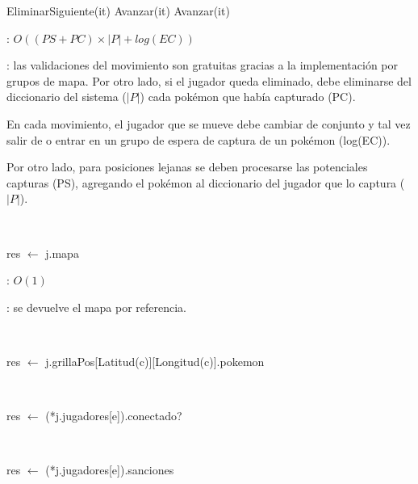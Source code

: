 \begin{Algoritmos}
\begin{algorithm}[H]
{{{					
					EliminarSiguiente(it)
				}{
					Avanzar(it)
				}
			}{
				Avanzar(it)
			}
		}
	\end{algorithm}

	\complejidad: $O((PS + PC) \times |P| + log(EC))$

	\justifcomp: las validaciones del movimiento son gratuitas gracias a la implementación por grupos de mapa. Por otro lado, si el jugador queda eliminado, debe eliminarse del diccionario del sistema ($|P|$) cada pokémon que había capturado (PC).

	En cada movimiento, el jugador que se mueve debe cambiar de conjunto y tal vez salir de o entrar en un grupo de espera de captura de un pokémon (log(EC)).

	Por otro lado, para posiciones lejanas se deben procesarse las potenciales capturas (PS), agregando el pokémon al diccionario del jugador que lo captura ($|P|$).

	~

	\begin{algorithm}[H]
		\NoCaptionOfAlgo
		\caption{}
		res $\leftarrow$ j.mapa
	\end{algorithm}

	\complejidad: $O(1)$

	\justifcomp: se devuelve el mapa por referencia.

	~

	\begin{algorithm}[H]
		\NoCaptionOfAlgo
		\caption{}
		res $\leftarrow$ j.grillaPos[Latitud(c)][Longitud(c)].pokemon
	\end{algorithm}

	~

	\begin{algorithm}[H]
		\NoCaptionOfAlgo
		\caption{}
		res $\leftarrow$ (*j.jugadores[e]).conectado?
	\end{algorithm}

	~

	\begin{algorithm}[H]
		\NoCaptionOfAlgo
		\caption{}
		res $\leftarrow$ (*j.jugadores[e]).sanciones
	\end{algorithm}


\end{Algoritmos}
